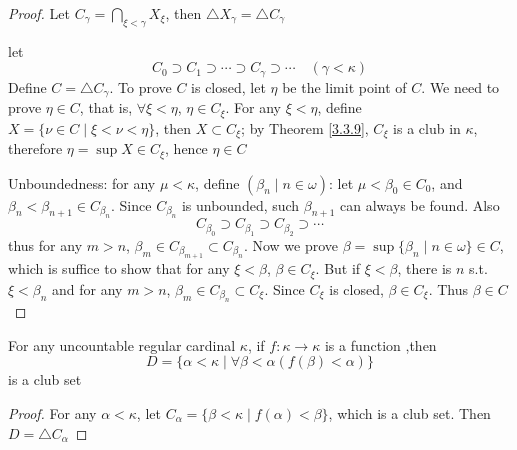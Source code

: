 \documentclass[11pt]{article}
\def \btu {\bigtriangleup}
\begin{document}
\begin{proof}
Let \(C_\gamma=\bigcap_{\xi<\gamma}X_\xi\), then \(\bigtriangleup X_\gamma=\bigtriangleup C_\gamma\)
\wu{
\begin{align*}
\eta\in\btu C_\gamma&\Leftrightarrow\forall\xi<\eta,\eta\in C_\xi=\bigcap_{\zeta<\xi}X_\zeta\\
&\Leftrightarrow\forall\zeta<\xi<\eta,\eta\in X_\zeta
\end{align*}
guess should be \(C_\gamma=\bigcap_{\xi\le\gamma}X_\xi\)
}


let
\begin{equation*}
C_0\supset C_1\supset\cdots\supset C_\gamma\supset\cdots\quad(\gamma<\kappa)
\end{equation*}
Define \(C=\btu C_\gamma\). To prove \(C\) is closed, let \(\eta\) be the limit point of \(C\). We need to
prove \(\eta\in C\), that is, \(\forall\xi<\eta\), \(\eta\in C_\xi\). For any \(\xi<\eta\), define \(X=\{\nu\in C\mid\xi<\nu<\eta\}\), then \(X\subset C_\xi\); by
Theorem \ref{3.3.9}, \(C_\xi\) is a club in \(\kappa\), therefore \(\eta=\sup X\in C_\xi\), hence \(\eta\in C\)

Unboundedness: for any \(\mu<\kappa\), define \((\beta_n\mid n\in\omega)\): let \(\mu<\beta_0\in C_0\),
and \(\beta_n<\beta_{n+1}\in C_{\beta_n}\). Since \(C_{\beta_n}\) is unbounded, such \(\beta_{n+1}\) can always be
found. Also
\begin{equation*}
C_{\beta_0}\supset C_{\beta_1}\supset C_{\beta_2}\supset\cdots
\end{equation*}
thus for any \(m>n\), \(\beta_m\in C_{\beta_{m+1}}\subset C_{\beta_n}\). Now we prove \(\beta=\sup\{\beta_n\mid n\in\omega\}\in C\), which
is suffice to show that for any \(\xi<\beta\), \(\beta\in C_\xi\). But if \(\xi<\beta\), there is \(n\) s.t. \(\xi<\beta_n\) and
for any \(m>n\), \(\beta_m\in C_{\beta_n}\subset C_\xi\). Since \(C_\xi\) is closed, \(\beta\in C_\xi\). Thus \(\beta\in C\)
\end{proof}

\begin{corollary}[]
For any uncountable regular cardinal \(\kappa\), if \(f:\kappa\to\kappa\) is a function ,then
\begin{equation*}
D=\{\alpha<\kappa\mid\forall\beta<\alpha(f(\beta)<\alpha)\}
\end{equation*}
is a club set
\end{corollary}

\begin{proof}
For any \(\alpha<\kappa\), let \(C_\alpha=\{\beta<\kappa\mid f(\alpha)<\beta\}\), which is a club set. Then \(D=\btu C_\alpha\)
\end{proof}
\end{document}
